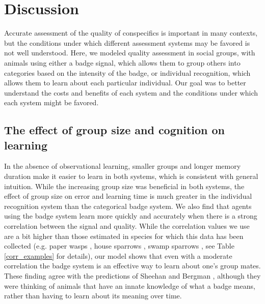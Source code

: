 \section*{Discussion}
Accurate assessment of the quality of conspecifics is important in many contexts, but the conditions under which different assessment systems may be favored is not well understood. Here, we modeled quality assessment in social groups, with animals using either a badge signal, which allows them to group others into categories based on the intensity of the badge, or individual recognition, which allows them to learn about each particular individual. Our goal was to better understand the costs and benefits of each system and the conditions under which each system might be favored. 

\subsection*{The effect of group size and cognition on learning} %
In the absence of observational learning, smaller groups and longer memory duration make it easier to learn in both systems, which is consistent with general intuition. While the increasing group size was beneficial in both systems, the effect of group size on error and learning time is much greater in the individual recognition system than the categorical badge system. We also find that agents using the badge system learn more quickly and accurately when there is a strong correlation between the signal and quality. While the correlation values we use are a bit higher than those estimated in species for which this data has been collected (e.g. paper wasps \citep{Tibbetts:2004kx}, house sparrows \citep{Veiga:1993fk}, swamp sparrows \citep{Olsen:2010uq}, see Table \ref{corr_examples} for details), our model shows that even with a moderate correlation the badge system is an effective way to learn about one's group mates. These finding agree with the predictions of Sheehan and Bergman \citep{sheehan2016evotradeoff}, although they were thinking of animals that have an innate knowledge of what a badge means, rather than having to learn about its meaning over time.

